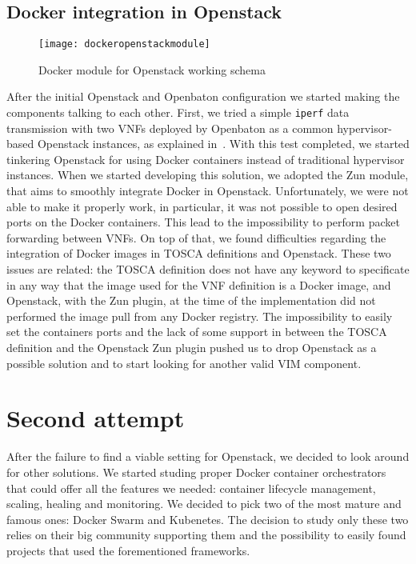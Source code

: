 \subsection{Docker integration in Openstack}

\begin{figure}[t]
  \centering
  \texttt{[image: dockeropenstackmodule]}
  \caption[Docker module for Openstack working schema]{Docker module for Openstack
    working schema~\cite{openstackDockerModule}}
  \label{chap:archimpl:sec:fistattempt:img:dockeropnestackmodule}
\end{figure}

After the initial Openstack and Openbaton configuration we started making the
components talking to each other. First, we tried a simple \verb!iperf! data
transmission with two VNFs deployed by Openbaton as a common hypervisor-based
Openstack instances, as explained in~\cite{openbatonIperf}. With this test
completed, we started tinkering Openstack for using Docker containers instead of
traditional hypervisor instances. When we started developing this solution, we
adopted the Zun module, that aims to smoothly integrate Docker in Openstack.
Unfortunately, we were not able to make it properly work, in particular, it was
not possible to open desired ports on the Docker containers. This lead to the
impossibility to perform packet forwarding between VNFs. On top of that, we
found difficulties regarding the integration of Docker images in TOSCA
definitions and Openstack. These two issues are related: the TOSCA definition
does not have any keyword to specificate in any way that the image used for the
VNF definition is a Docker image, and Openstack, with the Zun plugin, at the
time of the implementation did not performed the image pull from any Docker
registry. The impossibility to easily set the containers ports and the lack of
some support in between the TOSCA definition and the Openstack Zun plugin pushed
us to drop Openstack as a possible solution and to start looking for another
valid VIM component.

\section{Second attempt}

After the failure to find a viable setting for Openstack, we decided to look
around for other solutions. We started studing proper Docker container
orchestrators that could offer all the features we needed: container lifecycle
management, scaling, healing and monitoring. We decided to pick two of the most
mature and famous ones: Docker Swarm and Kubenetes. The decision to study only
these two relies on their big community supporting them and the possibility to
easily found projects that used the forementioned frameworks.

